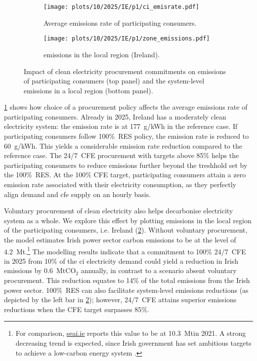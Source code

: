 \begin{figure}[t]
    \centering
    \begin{subfigure}[t]{0.95\columnwidth}
        \centering
        \caption{Average emissions rate of participating consumers.}
        \texttt{[image: plots/10/2025/IE/p1/ci\_emisrate.pdf]}
        \label{fig:10-2025-IE-p1-ci_emisrate}
    \end{subfigure}
    \begin{subfigure}[t]{0.95\columnwidth}
        \centering
        \vspace{-0.2cm}
        \caption{\co emissions in the local region (Ireland).}
        \texttt{[image: plots/10/2025/IE/p1/zone\_emissions.pdf]}
        \label{fig:10-2025-IE-p1-zone_emissions}
    \end{subfigure}
    \caption{Impact of clean electricity procurement commitments on emissions of participating consumers (top panel) and the system-level emissions in a local region (bottom panel).}
    \label{fig:10-2025-IE-p1-emissions}
\end{figure}

\cref{fig:10-2025-IE-p1-ci_emisrate} shows how choice of a procurement policy affects the average emissions rate of participating consumers.
Already in 2025, Ireland has a moderately clean electricity system: the emission rate is at 177~g\co/kWh in the reference case.
If participating consumers follow 100\%~RES policy, the emission rate is reduced to 60~g\co/kWh.
This yields a considerable emission rate reduction compared to the reference case.
The 24/7~CFE procurement with targets above 85\% helps the participating consumers to reduce emissions further beyond the treshhold set by the 100\%~RES. 
At the 100\% CFE target, participating consumers attain a zero emission rate associated with their electricity consumption, as they perfectly align demand and \gls{cfe} supply on an hourly basis.

Voluntary procurement of clean electricity also helps decarbonise electricity system as a whole.
We explore this effect by plotting \co emissions in the local region of the participating consumers, i.e. Ireland (\cref{fig:10-2025-IE-p1-zone_emissions}).
Without voluntary procurement, the model estimates Irish power sector carbon emissions to be at the level of 4.2~Mt\co.\footnote{For comparison, \href{https://www.seai.ie/data-and-insights/seai-statistics/key-publications/co2-emissions-report/}{seai.ie} reports this value to be at 10.3~Mt\co in 2021. A strong decreasing trend is expected, since Irish government has set ambitious targets to achieve a low-carbon energy system \cite{seaiCOEmissionsReport2020}.}
The modelling results indicate that a commitment to 100\% 24/7~CFE in 2025 from 10\% of the \gls{ci} electricity demand could yield a reduction in Irish emissions by 0.6~MtCO$_2$ annually, in contrast to a scenario absent voluntary procurement. 
This reduction equates to 14\% of the total emissions from the Irish power sector.
100\%~RES can also facilitate system-level \co emissions reductions (as depicted by the left bar in \cref{fig:10-2025-IE-p1-zone_emissions}); however, 24/7~CFE attains superior emissions reductions when the CFE target surpasses 85\%.


